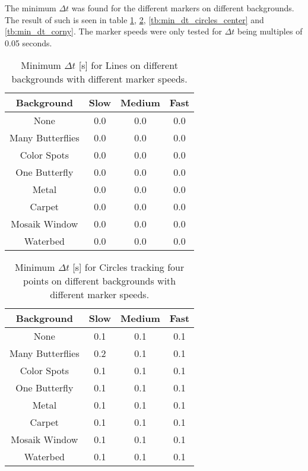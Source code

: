 The minimum $\Delta t$ was found for the different markers on different backgrounds.
The result of such is seen in table \ref{tb:min_dt_lines}, \ref{tb:min_dt_circles}, \ref{tb:min_dt_circles_center} and \ref{tb:min_dt_corny}.
The marker speeds were only tested for $\Delta t$ being multiples of 0.05 seconds.

\begin{table}[H]
\center
\begin{tabular}{|c|c|c|c|}
\hline
Background        & Slow & Medium & Fast \\ \hline
None              & 0.0  & 0.0    & 0.0  \\ \hline
Many Butterflies  & 0.0  & 0.0    & 0.0  \\ \hline
Color Spots       & 0.0  & 0.0    & 0.0  \\ \hline
One Butterfly     & 0.0  & 0.0    & 0.0  \\ \hline
Metal             & 0.0  & 0.0    & 0.0  \\ \hline
Carpet            & 0.0  & 0.0    & 0.0  \\ \hline
Mosaik Window     & 0.0  & 0.0    & 0.0  \\ \hline
Waterbed          & 0.0  & 0.0    & 0.0  \\ \hline
\end{tabular}
\caption{Minimum $\Delta t$ [s] for Lines on different backgrounds with different marker speeds.}
 \label{tb:min_dt_lines}
\end{table}

\begin{table}[H]
\center
\begin{tabular}{|c|c|c|c|}
\hline
Background       & Slow & Medium & Fast \\ \hline
None             & 0.1  & 0.1    & 0.1  \\ \hline
Many Butterflies & 0.2  & 0.1    & 0.1  \\ \hline
Color Spots      & 0.1  & 0.1    & 0.1  \\ \hline
One Butterfly    & 0.1  & 0.1    & 0.1  \\ \hline
Metal            & 0.1  & 0.1    & 0.1  \\ \hline
Carpet           & 0.1  & 0.1    & 0.1  \\ \hline
Mosaik Window    & 0.1  & 0.1    & 0.1  \\ \hline
Waterbed         & 0.1  & 0.1    & 0.1  \\ \hline
\end{tabular}
\caption{Minimum $\Delta t$ [s] for Circles tracking four points on different backgrounds with different marker speeds.}
\label{tb:min_dt_circles}
\end{table}


